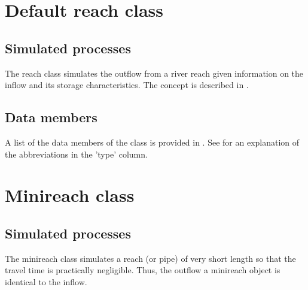 
\section{Default reach class} \label{sec:classes:catchmod:reach-default}

\subsection{Simulated processes} \label{sec:classes:catchmod:reach-default:processes}
The reach class simulates the outflow from a river reach given information on the inflow and its storage characteristics. The concept is described in .

\subsection{Data members} \label{sec:classes:catchmod:reach-default:members}
A list of the data members of the class is provided in . See \citet{Echse-Main-Doc} for an explanation of the abbreviations in the 'type' column.



\section{Minireach class} \label{sec:classes:catchmod:minireach}

\subsection{Simulated processes} \label{sec:classes:catchmod:minireach:processes}
The minireach class simulates a reach (or pipe) of very short length so that the travel time is practically negligible. Thus, the outflow a minireach object is identical to the inflow.

